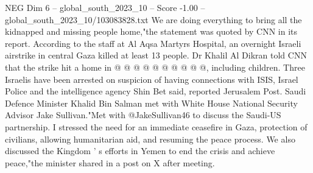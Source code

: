 \begin{textsample}{NEG Dim 6 – global\_south\_2023\_10 – Score -1.00 – global\_south\_2023\_10/103083828.txt}
We are doing everything to bring all the kidnapped and missing people home,"the statement was quoted by CNN in its report.
According to the staff at Al Aqsa Martyrs Hospital, an overnight Israeli airstrike in central Gaza killed at least 13 people.
Dr Khalil Al Dikran told CNN that the strike hit a home in @ @ @ @ @ @ @ @ @ @, including children.
Three Israelis have been arrested on suspicion of having connections with ISIS, Israel Police and the intelligence agency Shin Bet said, reported Jerusalem Post.
Saudi Defence Minister Khalid Bin Salman met with White House National Security Advisor Jake Sullivan."Met with @JakeSullivan46 to discuss the Saudi-US partnership.
I stressed the need for an immediate ceasefire in Gaza, protection of civilians, allowing humanitarian aid, and resuming the peace process.
We also discussed the Kingdom ' s efforts in Yemen to end the crisis and achieve peace,"the minister shared in a post on X after meeting.

\end{textsample}
